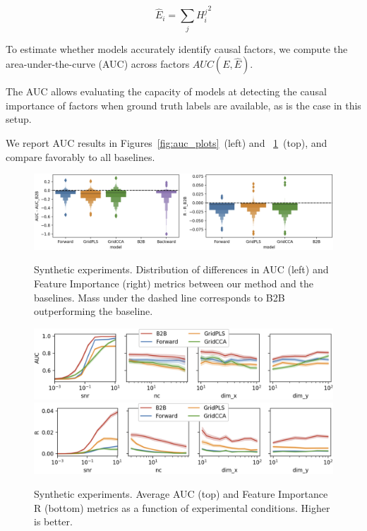\begin{equation} \hat E_i = \sum_j {H^j_i}^2 \end{equation}

To estimate whether models accurately identify causal factors, we compute the
area-under-the-curve (AUC) across factors $AUC(E, \hat E)$.

The AUC allows evaluating the capacity of models at detecting the causal
importance of factors when ground truth labels are available, as is the case in
this setup.

We report AUC results in Figures~\ref{fig:auc_plots}~(left) and ~\ref{fig:percondition}~(top), and compare favorably to all baselines.

\begin{figure}
  \centering
  \includegraphics[width=\linewidth]{figures/AUC_R.png}
  \vspace{-4ex}
  \caption{Synthetic experiments. Distribution of differences in AUC (left) and Feature Importance (right) metrics between our method and the baselines. Mass under the dashed line corresponds to B2B outperforming the baseline. \label{fig:auc_plots}}
  \vspace{2ex}
  \includegraphics[width=\linewidth]{figures/AUC_conditions.png}
  \includegraphics[width=\linewidth]{figures/R_conditions.png}
  \vspace{-4ex}
  \caption{Synthetic experiments. Average AUC (top) and Feature Importance R (bottom) metrics as a function of experimental conditions. Higher is better. \label{fig:percondition}}
\end{figure}

